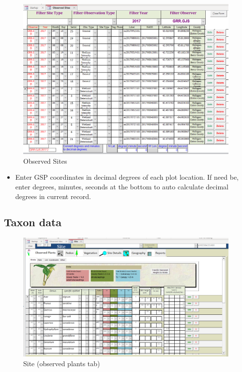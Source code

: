 \documentclass[
]{book}
\providecommand{\tightlist}{%
  \setlength{\itemsep}{0pt}\setlength{\parskip}{0pt}}
\begin{document}
\begin{figure}
\centering
\includegraphics{static-figures/veglog2.png}
\caption{Observed Sites}
\end{figure}

\begin{itemize}
\tightlist
\item
  Enter GSP coordinates in decimal degrees of each plot location. If need be, enter degrees, minutes, seconds at the bottom to auto calculate decimal degrees in current record.
\end{itemize}

\hypertarget{taxon-data}{%
\subsection*{Taxon data}\label{taxon-data}}

\begin{figure}
\centering
\includegraphics{static-figures/veglog3.png}
\caption{Site (observed plants tab)}
\end{figure}
\end{document}
